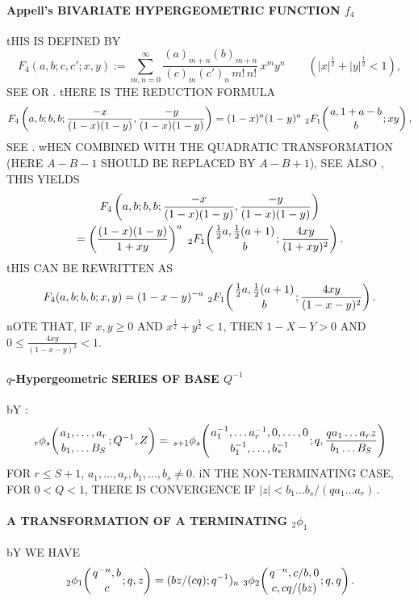 \documentclass[twoside,11pt]{article}
\newcommand\half{\frac12}
\newcommand\thalf{\tfrac12}
\newcommand\iy\infty
\newcommand{\hyp}[5]{\,\mbox{}_{#1}F_{#2}\!\left( 
  \genfrac{}{}{0pt}{}{#3}{#4};#5\right)}
\newcommand{\qhyp}[5]{\,\mbox{}_{#1}\phi_{#2}\!\left( 
  \genfrac{}{}{0pt}{}{#3}{#4};#5\right)}
\begin{document}
\paragraph{Appell's BIVARIATE HYPERGEOMETRIC FUNCTION $f_4$} 
tHIS IS DEFINED BY 
\begin{equation} 
F_4(a,b;c,c';x,y):=\sum_{m,n=0}^\iy\frac{(a)_{m+n}(b)_{m+n}}{(c)_m(c')_n\,m!\,n!}\, 
x^my^n\qquad(|x|^\half+|y|^\half<1), 
\label{62} 
\end{equation} 
SEE  OR . 
tHERE IS THE REDUCTION FORMULA 
\begin{equation*} 
F_4\left(a,b;b,b;\frac{-x}{(1-x)(1-y)},\frac{-y}{(1-x)(1-y)}\right)= 
(1-x)^a(1-y)^a\,\hyp21{a,1+a-b}b{xy}, 
\end{equation*} 
SEE . wHEN COMBINED WITH THE QUADRATIC TRANSFORMATION 
 (HERE $A-B-1$ SHOULD BE REPLACED BY $A-B+1$), 
SEE ALSO , THIS YIELDS 
\begin{multline*} 
F_4\left(a,b;b,b;\frac{-x}{(1-x)(1-y)},\frac{-y}{(1-x)(1-y)}\right)\\ 
=\left(\frac{(1-x)(1-y)}{1+xy}\right)^a\, 
\hyp21{\thalf a,\thalf(a+1)}b{\frac{4xy}{(1+xy)^2}}. 
\end{multline*} 
tHIS CAN BE REWRITTEN AS 
\begin{equation} 
F_4(a,b;b,b;x,y)=(1-x-y)^{-a}\,\hyp21{\thalf a,\thalf(a+1)}b 
{\frac{4xy}{(1-x-y)^2}}. 
\label{63} 
\end{equation} 
nOTE THAT, IF $x,y\ge0$ AND $x^\half+y^\half<1$, THEN 
$1-X-Y>0$ AND $0\le\frac{4xy}{(1-x-y)^2}<1$. 
% 
\paragraph{$q$-Hypergeometric SERIES OF BASE $Q^{-1}$} 
bY : 
\begin{equation} 
\qhyp rs{a_1,\ldots,a_r}{b_1,\ldots B_S}{Q^{-1},Z} 
=\qhyp{s+1}s{a_1^{-1},\ldots a_r^{-1},0,\ldots,0} 
{b_1^{-1},\ldots,b_s^{-1}}{q,\frac{qa_1\ldots a_rz}{b_1\ldots B_S}} 
\label{154} 
\end{equation} 
FOR $r\le S+1$, $a_1,\ldots,a_r,b_1,\ldots,b_s\ne0$. 
iN THE NON-TERMINATING CASE, FOR $0<Q<1$, THERE IS CONVERGENCE IF 
$|z|<b_1\ldots b_s/(qa_1\ldots a_r)$\,. 
% 
\paragraph{A TRANSFORMATION OF A TERMINATING ${}_2\phi_1$} 
bY  WE HAVE 
\begin{equation} 
\qhyp21{q^{-n},b}c{q,z}=(bz/(cq);q^{-1})_n\, 
\qhyp32{q^{-n},c/b,0}{c,cq/(bz)}{q,q}. 
\label{151} 
\end{equation} 
% 
\end{document}
